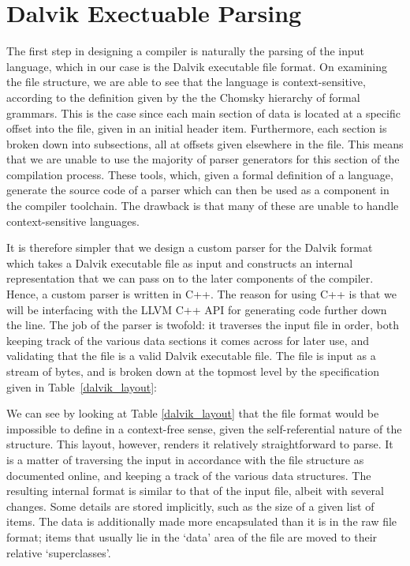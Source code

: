 \section{Dalvik Exectuable Parsing}

The first step in designing a compiler is naturally the parsing of the input language, which in our case is the Dalvik executable file format. On examining the file structure, we are able to see that the language is context-sensitive, according to the definition given by the the Chomsky hierarchy of formal grammars. This is the case since each main section of data is located at a specific offset into the file, given in an initial header item. Furthermore, each section is broken down into subsections, all at offsets given elsewhere in the file. This means that we are unable to use the majority of parser generators for this section of the compilation process. These tools, which, given a formal definition of a language, generate the source code of a parser which can then be used as a component in the compiler toolchain. The drawback is that many of these are unable to handle context-sensitive languages.


It is therefore simpler that we design a custom parser for the Dalvik format which takes a Dalvik executable file as input and constructs an internal representation that we can pass on to the later components of the compiler. Hence, a custom parser is written in C++. The reason for using C++ is that we will be interfacing with the LLVM C++ API for generating code further down the line. The job of the parser is twofold: it traverses the input file in order, both keeping track of the various data sections it comes across for later use, and validating that the file is a valid Dalvik executable file. The file is input as a stream of bytes, and is broken down at the topmost level by the specification given in Table~\ref{dalvik_layout}:

We can see by looking at Table \ref{dalvik_layout} that the file format would be impossible to define in a context-free sense, given the self-referential nature of the structure. This layout, however, renders it relatively straightforward to parse. It is a matter of traversing the input in accordance with the file structure as documented online\footnotemark {}, and keeping a track of the various data structures. The resulting internal format is similar to that of the input file, albeit with several changes. Some details are stored implicitly, such as the size of a given list of items. The data is additionally made more encapsulated than it is in the raw file format; items that usually lie in the `data' area of the file are moved to their relative `superclasses'.

